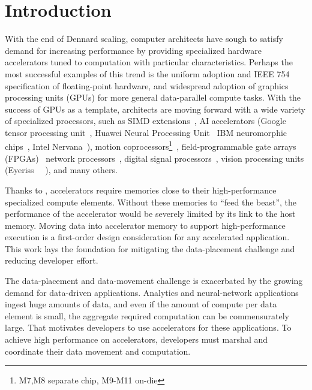 
\chapter{Introduction}


With the end of Dennard scaling, computer architects have sough to satisfy demand for increasing performance by providing specialized hardware accelerators tuned to computation with particular characteristics.
Perhaps the most successful examples of this trend is the uniform adoption and IEEE 754 specification of floating-point hardware, and widespread adoption of graphics processing units (GPUs) for more general data-parallel compute tasks.
With the success of GPUs as a template, architects are moving forward with a wide variety of specialized processors, such as
SIMD extensions~\cite{intel2017avx, matz2013sse, arm2017neon},
AI accelerators (Google tensor processing unit~\cite{jouppi2017datacenter}, Huawei Neural Processing Unit~\cite{huawei2017kirin} IBM neuromorphic chips~\cite{merolla2014million}, Intel Nervana~\cite{intel2017nervana}),
motion coprocessors\footnote{M7,M8 separate chip, M9-M11 on-die}~,
field-programmable gate arrays (FPGAs)~
network processors~,
digital signal processors~,
vision processing units (Eyeriss~\cite{chen2017eyeriss} ~),
and many others.

Thanks to , accelerators require memories close to their high-performance specialized compute elements.
Without these memories to ``feed the beast'', the performance of the accelerator would be severely limited by its link to the host memory.
Moving data into accelerator memory to support high-performance execution is a first-order design consideration for any accelerated application.
This work lays the foundation for mitigating the data-placement challenge and reducing developer effort.


The data-placement and data-movement challenge is exacerbated by the growing demand for data-driven applications.
Analytics and neural-network applications ingest huge amounts of data, and even if the amount of compute per data element is small, the aggregate required computation can be commensurately large.
That motivates developers to use accelerators for these applications.
To achieve high performance on accelerators, developers must marshal and coordinate their data movement and computation.

